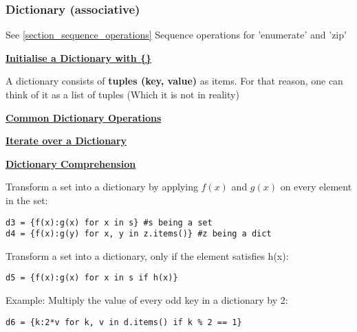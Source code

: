 \subsubsection{Dictionary (associative)}
See \ref{section_sequence_operations} Sequence operations for 'enumerate' and 'zip'\\
{\centering\underline{\textbf{Initialise a Dictionary with \{\}}} \par}
A dictionary consists of \textbf{tuples (key, value)} as items. For that reason, one can think of it as a list of tuples (Which it is not in reality)


{\centering\underline{\textbf{Common Dictionary Operations}} \par}


{\centering\underline{\textbf{Iterate over a Dictionary}} \par}


{\centering\underline{\textbf{Dictionary Comprehension}} \par}
Transform a set into a dictionary by applying $f(x)$ and $g(x)$ on every element in the set:
\begin{lstlisting}
d3 = {f(x):g(x) for x in s} #s being a set
d4 = {f(x):g(y) for x, y in z.items()} #z being a dict
\end{lstlisting}
Transform a set into a dictionary, only if the element satisfies h(x):
\begin{lstlisting}
d5 = {f(x):g(x) for x in s if h(x)}
\end{lstlisting}
Example: Multiply the value of every odd key in a dictionary by 2:
\begin{lstlisting}
d6 = {k:2*v for k, v in d.items() if k % 2 == 1}
\end{lstlisting}
